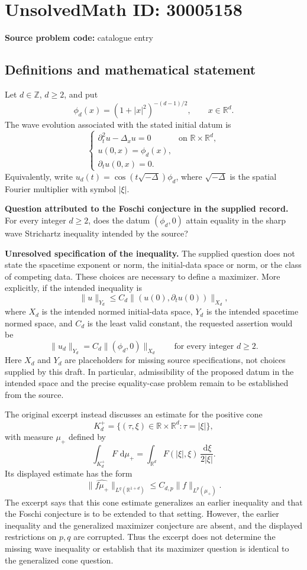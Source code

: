 \documentclass[11pt]{article}
\newcommand{\Z}{\mathbb{Z}}
\newcommand{\R}{\mathbb{R}}
\newcommand{\dd}{\,\mathrm{d}}
\begin{document}
\section*{UnsolvedMath ID: 30005158}
\textbf{Source problem code:} catalogue entry
\subsection{Definitions and mathematical statement}
Let \(d\in\Z\), \(d\geq2\), and put
\[
\phi_d(x)=(1+|x|^2)^{-(d-1)/2},\qquad x\in\R^d.
\]
The wave evolution associated with the stated initial datum is
\[
\begin{cases}
\partial_t^2u-\Delta_xu=0 & \text{on }\R\times\R^d,\\
u(0,x)=\phi_d(x),\\
\partial_tu(0,x)=0.
\end{cases}
\]
Equivalently, write \(u_d(t)=\cos(t\sqrt{-\Delta})\phi_d\), where \(\sqrt{-\Delta}\) is the spatial Fourier multiplier with symbol \(|\xi|\).

\textbf{Question attributed to the Foschi conjecture in the supplied record.} For every integer \(d\geq2\), does the datum \((\phi_d,0)\) attain equality in the sharp wave Strichartz inequality intended by the source?

\textbf{Unresolved specification of the inequality.} The supplied question does not state the spacetime exponent or norm, the initial-data space or norm, or the class of competing data. These choices are necessary to define a maximizer. More explicitly, if the intended inequality is
\[
\|u\|_{Y_d}\leq C_d\|(u(0),\partial_tu(0))\|_{X_d},
\]
where \(X_d\) is the intended normed initial-data space, \(Y_d\) is the intended spacetime normed space, and \(C_d\) is the least valid constant, the requested assertion would be
\[
\|u_d\|_{Y_d}=C_d\|(\phi_d,0)\|_{X_d}
\qquad\text{for every integer }d\geq2.
\]
Here \(X_d\) and \(Y_d\) are placeholders for missing source specifications, not choices supplied by this draft. In particular, admissibility of the proposed datum in the intended space and the precise equality-case problem remain to be established from the source.

The original excerpt instead discusses an estimate for the positive cone
\[
K_d^+=\{(\tau,\xi)\in\R\times\R^d:\tau=|\xi|\},
\]
with measure \(\mu_+\) defined by
\[
\int_{K_d^+}F\,\dd\mu_+
=\int_{\R^d}F(|\xi|,\xi)\,\frac{\dd\xi}{2|\xi|}.
\]
Its displayed estimate has the form
\[
\|\widehat{f\mu_+}\|_{L^q(\R^{1+d})}
\leq C_{d,p}\|f\|_{L^p(\mu_+)}.
\]
The excerpt says that this cone estimate generalizes an earlier inequality and that the Foschi conjecture is to be extended to that setting. However, the earlier inequality and the generalized maximizer conjecture are absent, and the displayed restrictions on \(p,q\) are corrupted. Thus the excerpt does not determine the missing wave inequality or establish that its maximizer question is identical to the generalized cone question.
\end{document}
